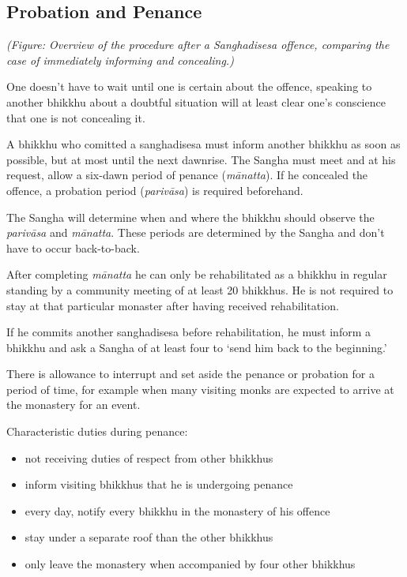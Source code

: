 \subsection{Probation and Penance}

\enlargethispage*{4\baselineskip}
\par
{}
\par
\clearpage

\emph{(Figure: Overview of the procedure after a Sanghadisesa offence,
comparing the case of immediately informing and concealing.)}

One doesn't have to wait until one is certain about the offence,
speaking to another bhikkhu about a doubtful situation will at least
clear one's conscience that one is not concealing it.

A bhikkhu who comitted a sanghadisesa must inform another bhikkhu as
soon as possible, but at most until the next dawnrise. The Sangha must
meet and at his request, allow a six-dawn period of penance
(\emph{mānatta}). If he concealed the offence, a probation period
(\emph{parivāsa}) is required beforehand.

The Sangha will determine when and where the bhikkhu should observe the
\emph{parivāsa} and \emph{mānatta}. These periods are determined by the
Sangha and don't have to occur back-to-back.

After completing \emph{mānatta} he can only be rehabilitated as a
bhikkhu in regular standing by a community meeting of at least 20
bhikkhus. He is not required to stay at that particular monaster after
having received rehabilitation.

If he commits another sanghadisesa before rehabilitation, he must inform
a bhikkhu and ask a Sangha of at least four to `send him back to the
beginning.'

There is allowance to interrupt and set aside the penance or probation
for a period of time, for example when many visiting monks are expected
to arrive at the monastery for an event.

Characteristic duties during penance:

\begin{itemize}
\tightlist
\item
  not receiving duties of respect from other bhikkhus
\item
  inform visiting bhikkhus that he is undergoing penance
\item
  every day, notify every bhikkhu in the monastery of his offence
\item
  stay under a separate roof than the other bhikkhus
\item
  only leave the monastery when accompanied by four other bhikkhus
\end{itemize}

